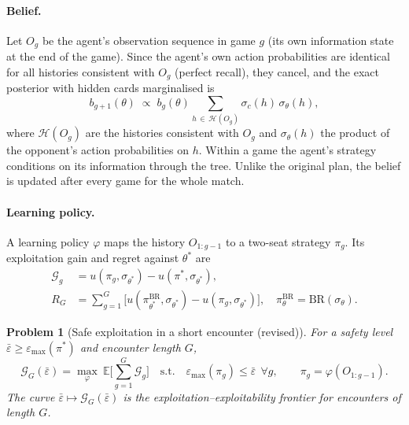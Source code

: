 \documentclass[11pt]{article}
\newtheorem{problem}{Problem}
\newcommand{\eps}{\varepsilon}
\newcommand{\epsbar}{\bar{\eps}}
\newcommand{\emax}{\eps_{\max}}
\newcommand{\BR}{\mathrm{BR}}
\newcommand{\new}[1]{\textcolor{blue!55!black}{#1}}
\begin{document}
\paragraph{Belief.} Let $O_g$ be the agent's observation sequence in game $g$ (its own information state at the end of the game). Since the agent's own action probabilities are identical for all histories consistent with $O_g$ (perfect recall), they cancel, and the exact posterior with hidden cards marginalised is
\begin{equation}\label{eq:post}
b_{g+1}(\theta)\;\propto\;b_g(\theta)\sum_{h\,\in\,\mathcal H(O_g)}\sigma_c(h)\,\sigma_\theta(h),
\end{equation}
where $\mathcal H(O_g)$ are the histories consistent with $O_g$ and $\sigma_\theta(h)$ the product of the opponent's action probabilities on $h$. Within a game the agent's strategy conditions on its information through the tree. \new{Unlike the original plan, the belief is updated after every game for the whole match.}

\paragraph{Learning policy.} A learning policy $\varphi$ maps the history $O_{1:g-1}$ to a two-seat strategy $\pi_g$. Its exploitation gain and regret against $\theta^*$ are
\begin{align}
\mathcal G_g&=u(\pi_g,\sigma_{\theta^*})-u(\pi^*,\sigma_{\theta^*}),\\
R_G&=\textstyle\sum_{g=1}^G\big[u(\pi^{\BR}_{\theta^*},\sigma_{\theta^*})-u(\pi_g,\sigma_{\theta^*})\big],\quad \pi^{\BR}_\theta=\BR(\sigma_\theta).
\end{align}

\begin{problem}[Safe exploitation in a short encounter \new{(revised)}]
For a safety level $\epsbar\ge\emax(\pi^*)$ and encounter length $G$,
\begin{equation}\label{eq:prob}
\mathcal G_G(\epsbar)=\max_\varphi\ \mathbb E\Big[\sum_{g=1}^G\mathcal G_g\Big]\quad\text{s.t.}\quad \emax(\pi_g)\le\epsbar\ \ \forall g,\qquad \pi_g=\varphi(O_{1:g-1}).
\end{equation}
The curve $\epsbar\mapsto\mathcal G_G(\epsbar)$ is the exploitation--exploitability frontier for encounters of length $G$.
\end{problem}
\end{document}
